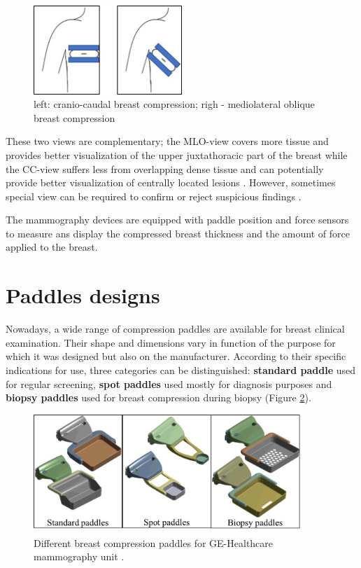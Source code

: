 \begin{figure}[!h]
\centering
\includegraphics[width=0.5\textwidth,keepaspectratio]{figures/cc_mlo_view.jpg} 
\caption{left: cranio-caudal breast compression; righ - mediolateral oblique breast compression }
\label{fig:cc_mlo_view}
\end{figure}

These two views are complementary; the MLO-view covers more tissue and provides better visualization of the upper juxtathoracic part of the breast while the CC-view suffers less from overlapping dense tissue and can potentially provide better visualization of centrally located lesions \citep{ikeda_second_1988,kim_computer_2006}. However, sometimes special view can be required  to confirm or reject suspicious findings \citep{groot_towards_2015}. 

The mammography devices are equipped with paddle position and force sensors to measure ans display the compressed breast thickness and the amount of force applied to the breast.

\section{Paddles designs} \label{section:compressionpaddlesdesign}

Nowadays, a wide range of compression paddles are available for breast clinical examination. Their shape and dimensions vary in function of the purpose for which it was designed but also on the manufacturer. According to their specific
indications for use, three categories can be distinguished: \textbf{standard paddle} used for regular screening, \textbf{spot paddles} used mostly for diagnosis purposes and \textbf{biopsy paddles} used for breast compression during biopsy (Figure \ref{fig:compressionpaddlestypes}). 


\begin{figure}[!h]
\centering
\includegraphics[width=0.9\textwidth,keepaspectratio]{figures/compressionpaddlestypes.jpg} 
\caption{Different breast compression paddles for GE-Healthcare mammography unit .}\label{fig:compressionpaddlestypes}
\end{figure}
    

